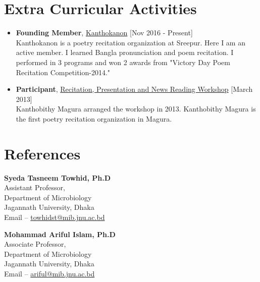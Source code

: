 \documentclass[11pt,a4paper]{moderncv}
\begin{document}
\section{Extra Curricular Activities}
\begin{itemize}
	\item \textbf{Founding Member}, 
	\textcolor{blue}{\href{}{Kanthokanon}}
	\hfill [Nov 2016 - Present]\\ 
	Kanthokanon is a poetry recitation organization at Sreepur. Here I am an 
	active member. I learned Bangla pronunciation and poem recitation. I 
	performed in 3 programs and won 2 awards from "Victory Day Poem Recitation 
	Competition-2014."
	
	\item \textbf{Participant}, 
	\textcolor{blue}{\href{}{Recitation, Presentation and News Reading 
	Workshop}}
	\hfill [March 2013]\\ 
	Kanthobithy Magura arranged the workshop in 2013. Kanthobithy Magura is the 
	first poetry recitation organization in Magura. 
	
	
\end{itemize}

\pagebreak
	
\section{References}
\begin{multicols}{2}
\textbf{Syeda Tasneem Towhid, Ph.D}\\ 
Assistant Professor, \\ 
Department of Microbiology \\ 
Jagannath University, Dhaka \\ 
Email -- \textcolor{blue}{\url{towhidst@mib.jnu.ac.bd}} 

\columnbreak 
\textbf{Mohammad Ariful Islam, Ph.D}\\ 
Associate Professor,\\ 
Department of Microbiology \\ 
Jagannath University, Dhaka \\ 
Email -- \textcolor{blue}{\url{ariful@mib.jnu.ac.bd}}
\end{multicols} 
\end{document}
